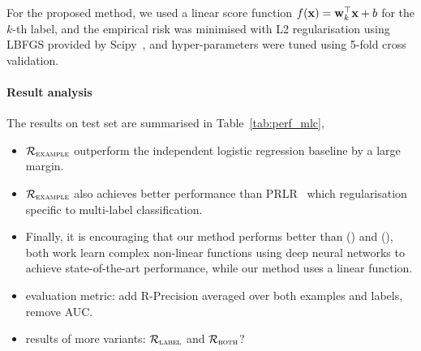 For the proposed method, we used a linear score function $f(\mathbf{x}) = \mathbf{w}_k^\top \mathbf{x} + b$ for the $k$-th label,
and the empirical risk was minimised with L2 regularisation using LBFGS provided by Scipy~\cite{},
and hyper-parameters were tuned using 5-fold cross validation.

\paragraph{Result analysis}
The results on test set are summarised in Table~\ref{tab:perf_mlc},
\begin{itemize}
\item $\mathcal{R}_\textsc{example}$ outperform the independent logistic regression baseline by a large margin.
\item $\mathcal{R}_\textsc{example}$ also achieves better performance than PRLR~\cite{lin2014multi} which regularisation specific to multi-label classification.
\item Finally, it is encouraging that our method performs better than (\cite{belanger2016structured}) and (\cite{gygli2017deep}),
both work learn complex non-linear functions using deep neural networks to achieve state-of-the-art performance, while our method uses a linear function.
\end{itemize}

\TODO
\begin{itemize}
\item evaluation metric: add R-Precision averaged over both examples and labels, remove AUC.
\item results of more variants: $\mathcal{R}_\textsc{label}$ and $\mathcal{R}_\textsc{both}$?
\end{itemize}


